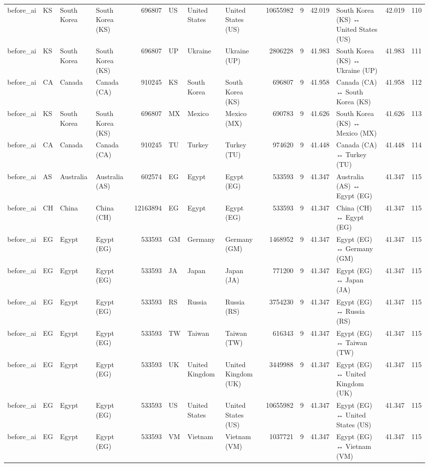 \begin{tabular}{llllrlllrrrlrr}
before\_ai & KS & South Korea & South Korea (KS) & 696807 & US & United States & United States (US) & 10655982 & 9 & 42.019 & South Korea (KS) ↔ United States (US) & 42.019 & 110 \\
before\_ai & KS & South Korea & South Korea (KS) & 696807 & UP & Ukraine & Ukraine (UP) & 2806228 & 9 & 41.983 & South Korea (KS) ↔ Ukraine (UP) & 41.983 & 111 \\
before\_ai & CA & Canada & Canada (CA) & 910245 & KS & South Korea & South Korea (KS) & 696807 & 9 & 41.958 & Canada (CA) ↔ South Korea (KS) & 41.958 & 112 \\
before\_ai & KS & South Korea & South Korea (KS) & 696807 & MX & Mexico & Mexico (MX) & 690783 & 9 & 41.626 & South Korea (KS) ↔ Mexico (MX) & 41.626 & 113 \\
before\_ai & CA & Canada & Canada (CA) & 910245 & TU & Turkey & Turkey (TU) & 974620 & 9 & 41.448 & Canada (CA) ↔ Turkey (TU) & 41.448 & 114 \\
before\_ai & AS & Australia & Australia (AS) & 602574 & EG & Egypt & Egypt (EG) & 533593 & 9 & 41.347 & Australia (AS) ↔ Egypt (EG) & 41.347 & 115 \\
before\_ai & CH & China & China (CH) & 12163894 & EG & Egypt & Egypt (EG) & 533593 & 9 & 41.347 & China (CH) ↔ Egypt (EG) & 41.347 & 115 \\
before\_ai & EG & Egypt & Egypt (EG) & 533593 & GM & Germany & Germany (GM) & 1468952 & 9 & 41.347 & Egypt (EG) ↔ Germany (GM) & 41.347 & 115 \\
before\_ai & EG & Egypt & Egypt (EG) & 533593 & JA & Japan & Japan (JA) & 771200 & 9 & 41.347 & Egypt (EG) ↔ Japan (JA) & 41.347 & 115 \\
before\_ai & EG & Egypt & Egypt (EG) & 533593 & RS & Russia & Russia (RS) & 3754230 & 9 & 41.347 & Egypt (EG) ↔ Russia (RS) & 41.347 & 115 \\
before\_ai & EG & Egypt & Egypt (EG) & 533593 & TW & Taiwan & Taiwan (TW) & 616343 & 9 & 41.347 & Egypt (EG) ↔ Taiwan (TW) & 41.347 & 115 \\
before\_ai & EG & Egypt & Egypt (EG) & 533593 & UK & United Kingdom & United Kingdom (UK) & 3449988 & 9 & 41.347 & Egypt (EG) ↔ United Kingdom (UK) & 41.347 & 115 \\
before\_ai & EG & Egypt & Egypt (EG) & 533593 & US & United States & United States (US) & 10655982 & 9 & 41.347 & Egypt (EG) ↔ United States (US) & 41.347 & 115 \\
before\_ai & EG & Egypt & Egypt (EG) & 533593 & VM & Vietnam & Vietnam (VM) & 1037721 & 9 & 41.347 & Egypt (EG) ↔ Vietnam (VM) & 41.347 & 115 \\

\end{tabular}
